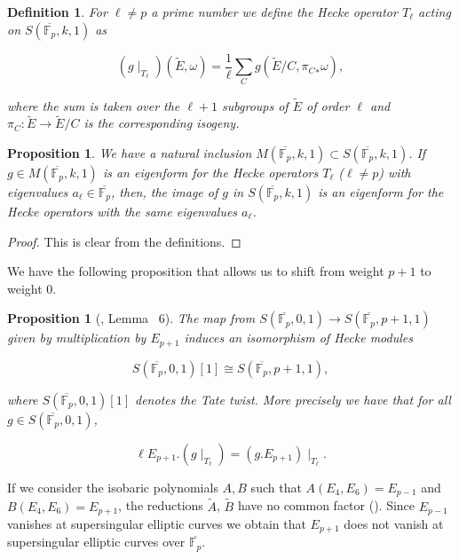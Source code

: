 \documentclass[13pt]{amsart}
\newtheorem{proposition}[theorem]{Proposition}
\newtheorem{definition}[theorem]{Definition}
\theoremstyle{remark}
\numberwithin{theorem}{section} \numberwithin{equation}{section}
\begin{document}
\begin{definition} \label{def:Hecke}
For $\ell \neq p$ a prime number we define the Hecke operator $T_{\ell}$ acting on $S(\overline{\mathbb{F}_p},k,1)$ as

\[  (g \mid_{T_{\ell}})(\tilde{E},\omega)= \frac{1}{\ell} \sum_{C} g(\tilde{E}/C, {\pi_{C}}_{\ast} \omega)  ,\]

where the sum is taken over the $\ell+1$ subgroups of $\tilde{E}$ of order $\ell$ and  $\pi_{C}: \tilde{E} \rightarrow  \tilde{E}/C$ is the corresponding isogeny.
 
\end{definition}

\begin{proposition} \label{inclusion}
We have a natural inclusion $M(\overline{\mathbb{F}_p},k,1) \subset {S}(\overline{\mathbb{F}_p},k,1)$. If $g \in M(\overline{\mathbb{F}_p},k,1)$ is an eigenform for the Hecke operators $T_{\ell}$ ($\ell \neq p$)
with eigenvalues $a_{\ell} \in \overline{\mathbb{F}_p}$, then, the image of $g$ in $ {S}(\overline{\mathbb{F}_p},k,1)$ is an eigenform for the Hecke operators with the same
eigenvalues $a_{\ell}$.
 \end{proposition}

\begin{proof}
 This is clear from the definitions.
\end{proof}

We have the following proposition  that allows us to 
shift from weight $p+1$ to weight $0$.

\begin{proposition}[\cite{Robert}, Lemma ~6] \label{prop:Robert}
 The map from ${S}(\overline{\mathbb{F}_p},0,1) \rightarrow {S}(\overline{\mathbb{F}_p},p+1,1)$ given by multiplication by $E_{p+1}$ induces an isomorphism of Hecke modules
 
\[{S}(\overline{\mathbb{F}_p},0,1)[1] \cong {S}(\overline{\mathbb{F}_p},p+1,1),  \]

where  ${S}(\overline{\mathbb{F}_p},0,1)[1]$ denotes the Tate twist. More precisely we have that for all $g \in {S}(\overline{\mathbb{F}_p},0,1)$,

\[ \ell E_{p+1}.  (g\mid_{T_{\ell}}) = (g.E_{p+1}) \mid_{T_\ell} .\]
\end{proposition}

If we consider the isobaric polynomials $A,B$ such that $A(E_4,E_6)=E_{p-1}$ 
and $B(E_4,E_6)=E_{p+1}$, the reductions $\tilde{A}$, $\tilde{B}$ have no 
common factor (\cite[Corollary ~1 of Theorem ~5]{Ser}).  Since $E_{p-1}$ 
vanishes  at supersingular elliptic curves we obtain that 
$E_{p+1}$ does not vanish at supersingular elliptic curves over 
$\overline{\mathbb{F}_p}$.
\end{document}
